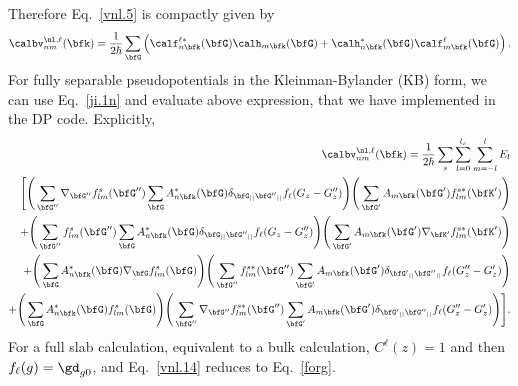 Therefore Eq.~\eqref{vnl.5} is compactly given by
\begin{align}\label{vnl.13}
\calbv^{\nl,\ell}_{nm}(\bfk)=\frac{1}{2 \hbar}
\sum_{\bfG}
\left(
\calf^{\ell*}_{n\bfk}(\bfG) 
\calh_{m\bfk}(\bfG) 
+
\calh^*_{n\bfk}(\bfG) 
\calf^\ell_{m\bfk}(\bfG) 
\right)
.
\end{align} 
For fully  separable pseudopotentials in the 
Kleinman-Bylander (KB) form,\cite{mottaCMS10,kleinman_efficacious_1982,adolphPRB96}
we can use Eq.~\eqref{ji.1n} and evaluate above expression, that we have
implemented in 
the DP code.\cite{francesco}
Explicitly,
\begin{eqnarray}\label{vnl.14}
\calbv^{\nl,\ell}_{nm}(\bfk)=\frac{1}{2 \hbar}
\sum_s\sum_{l=0}^{l_s}\sum_{m=-l}^{l}E_l \nonumber\\
\Bigg[ \Bigg(\sum_{{\bfG''}}
\nabla_{{\bfG''}}f_{lm}^s({\bfG''})
\sum_{\bfG}A^*_{n{\bfk}}(\bfG)\delta_{\bfG_{||}{\bfG''}_{||}}
f_\ell(G_z-G''_z) \Bigg)  
\Bigg( \sum_{{\bfG'}}A_{m{\bfk}}({\bfG'})f_{lm}^{s*}({\bfK'}) \Bigg) \nonumber\\
%
+ \Bigg(\sum_{{\bfG''}}
f_{lm}^s({\bfG''})\sum_{\bfG}A^*_{n{\bfk}}(\bfG)\delta_{\bfG_{||}{\bfG''}_{||}}
f_\ell(G_z-G''_z) \Bigg)  
\Bigg( \sum_{{\bfG'}}A_{m{\bfk}}({\bfG'})\nabla_{{\bfK'}}f_{lm}^{s*}({\bfK'}) \Bigg)  \nonumber\\
+
\Bigg(\sum_{\bfG}A^*_{n{\bfk}}(\bfG)\nabla_{\bfG}f_{lm}^s(\bfG)\Bigg)\Bigg(
\sum_{{\bfG''}}
f_{lm}^{s*}({\bfG''})\sum_{{\bfG'}}A_{m{\bfk}}({\bfG'})\delta_{{\bfG'}_{||}{\bfG''}_{||}}
f_\ell(G''_z-G'_z) \Bigg) \nonumber\\ 
+
\Bigg(\sum_{\bfG}A^*_{n{\bfk}}(\bfG)f_{lm}^s(\bfG)
\Bigg) \Bigg(
\sum_{{\bfG''}}\nabla_{{\bfG''}}f_{lm}^{s*}({\bfG''})
\sum_{{\bfG'}}A_{m{\bfk}}({\bfG'})\delta_{{\bfG'}_{||}{\bfG''}_{||}}
f_\ell(G''_z-G'_z) \Bigg) \Bigg].\nonumber\\ 
\end{eqnarray} 
For a full slab calculation, equivalent to a bulk calculation,
$C^\ell(z)=1$ and then 
$f_\ell(g) =\gd_{g0}$, and Eq.~\eqref{vnl.14}
reduces to 
Eq.~\eqref{forg}. 

